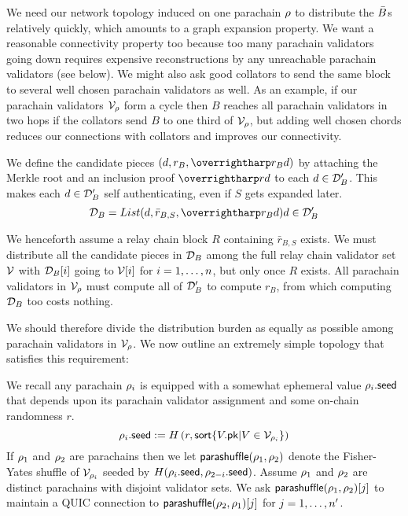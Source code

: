 \smallskip

We need our network topology induced on one parachain $\rho$ to distribute the $\bar{B}$s relatively quickly, which amounts to a graph expansion property.  We want a reasonable connectivity property too because too many parachain validators going down requires expensive reconstructions by any unreachable parachain validators (see  below).  We might also ask good collators to send the same block to several well chosen parachain validators as well.  As an example, if our parachain validators $\mathcal{V}_{\rho}$ form a cycle then $B$ reaches all parachain validators in two hops if the collators send $B$ to one third of $\mathcal{V}_{\rho}$, but adding well chosen chords reduces our connections with collators and improves our connectivity.  

\smallskip

We define the candidate pieces $(d,r_B,\vect{r_B d})$ by attaching the Merkle root and an inclusion proof $\vect{rd}$ to each $d \in \mathcal{D}'_B$.  This makes each $d \in \mathcal{D}'_B$ self authenticating, even if $S$ gets expanded later.
$$ \pieces_B = List{ (d,\bar{r}_{B,S},\vect{r_B d}) }{ d \in \pieces'_B } $$

We henceforth assume a relay chain block $R$ containing $\bar{r}_{B,S}$ exists.  We must distribute all the candidate pieces in $\mathcal{D}_B$ among the full relay chain validator set $\mathcal{V}$ with $\mathcal{D}_B[i]$ going to $\mathcal{V}[i]$ for $i = 1,\ldots,n$, but only once $R$ exists.  All parachain validators in $\mathcal{V}_{\rho}$ must compute all of $\mathcal{D}'_B$ to compute $r_B$, from which computing $\mathcal{D}_B$ too costs nothing.  

We should therefore divide the distribution burden as equally as possible among parachain validators in $\mathcal{V}_{\rho}$.  We now outline an extremely simple topology that satisfies this requirement:

We recall any parachain $\rho_i$ is equipped with a somewhat ephemeral value $\rho_i.\mathsf{seed}$ that depends upon its parachain validator assignment and some on-chain randomness $r$.
$$ \rho_i.\mathsf{seed} := H\left( r, \mathsf{sort} \{  V.\mathsf{pk}  |  V \in \mathcal{V}_{\rho_i}  \} \right) $$
If $\rho_1$ and $\rho_2$ are parachains then we let $\mathsf{parashuffle}(\rho_1,\rho_2)$ denote the Fisher-Yates shuffle of $\mathcal{V}_{\rho_i}$ seeded by $H( \rho_i.\mathsf{seed}, \rho_{2-i}.\mathsf{seed} )$.  Assume $\rho_1$ and $\rho_2$ are distinct parachains with disjoint validator sets.  We ask $\mathsf{parashuffle}(\rho_1,\rho_2)[j]$ to maintain a QUIC connection to $\mathsf{parashuffle}(\rho_2,\rho_1)[j]$ for $j = 1,\ldots,n'$.  


